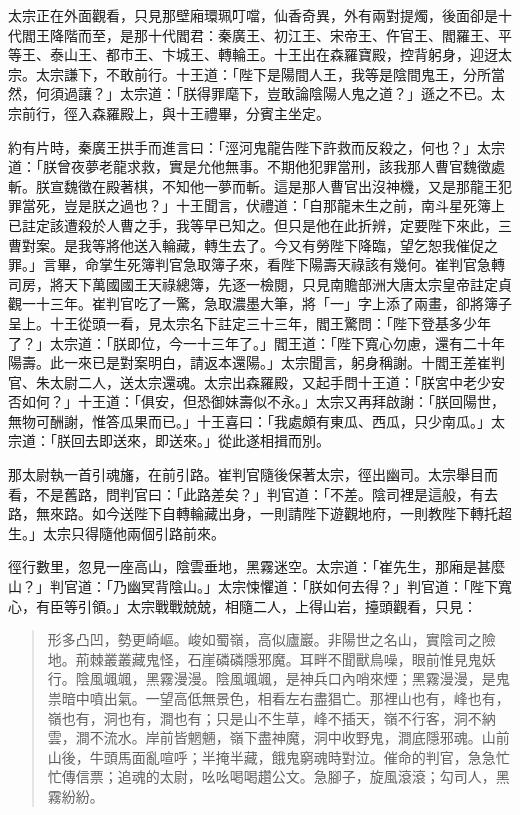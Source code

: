 太宗正在外面觀看，只見那壁廂環珮叮噹，仙香奇異，外有兩對提燭，後面卻是十代閻王降階而至，是那十代閻君：秦廣王、初江王、宋帝王、仵官王、閻羅王、平等王、泰山王、都市王、卞城王、轉輪王。十王出在森羅寶殿，控背躬身，迎迓太宗。太宗謙下，不敢前行。十王道：「陛下是陽間人王，我等是陰間鬼王，分所當然，何須過讓？」太宗道：「朕得罪麾下，豈敢論陰陽人鬼之道？」遜之不已。太宗前行，徑入森羅殿上，與十王禮畢，分賓主坐定。

約有片時，秦廣王拱手而進言曰：「涇河鬼龍告陛下許救而反殺之，何也？」太宗道：「朕曾夜夢老龍求救，實是允他無事。不期他犯罪當刑，該我那人曹官魏徵處斬。朕宣魏徵在殿著棋，不知他一夢而斬。這是那人曹官出沒神機，又是那龍王犯罪當死，豈是朕之過也？」十王聞言，伏禮道：「自那龍未生之前，南斗星死簿上已註定該遭殺於人曹之手，我等早已知之。但只是他在此折辨，定要陛下來此，三曹對案。是我等將他送入輪藏，轉生去了。今又有勞陛下降臨，望乞恕我催促之罪。」言畢，命掌生死簿判官急取簿子來，看陛下陽壽天祿該有幾何。崔判官急轉司房，將天下萬國國王天祿總簿，先逐一檢閱，只見南贍部洲大唐太宗皇帝註定貞觀一十三年。崔判官吃了一驚，急取濃墨大筆，將「一」字上添了兩畫，卻將簿子呈上。十王從頭一看，見太宗名下註定三十三年，閻王驚問：「陛下登基多少年了？」太宗道：「朕即位，今一十三年了。」閻王道：「陛下寬心勿慮，還有二十年陽壽。此一來已是對案明白，請返本還陽。」太宗聞言，躬身稱謝。十閻王差崔判官、朱太尉二人，送太宗還魂。太宗出森羅殿，又起手問十王道：「朕宮中老少安否如何？」十王道：「俱安，但恐御妹壽似不永。」太宗又再拜啟謝：「朕回陽世，無物可酬謝，惟答瓜果而已。」十王喜曰：「我處頗有東瓜、西瓜，只少南瓜。」太宗道：「朕回去即送來，即送來。」從此遂相揖而別。

那太尉執一首引魂旛，在前引路。崔判官隨後保著太宗，徑出幽司。太宗舉目而看，不是舊路，問判官曰：「此路差矣？」判官道：「不差。陰司裡是這般，有去路，無來路。如今送陛下自轉輪藏出身，一則請陛下遊觀地府，一則教陛下轉托超生。」太宗只得隨他兩個引路前來。

徑行數里，忽見一座高山，陰雲垂地，黑霧迷空。太宗道：「崔先生，那廂是甚麼山？」判官道：「乃幽冥背陰山。」太宗悚懼道：「朕如何去得？」判官道：「陛下寬心，有臣等引領。」太宗戰戰兢兢，相隨二人，上得山岩，擡頭觀看，只見：
\begin{quote}
形多凸凹，勢更崎嶇。峻如蜀嶺，高似廬巖。非陽世之名山，實陰司之險地。荊棘叢叢藏鬼怪，石崖磷磷隱邪魔。耳畔不聞獸鳥噪，眼前惟見鬼妖行。陰風颯颯，黑霧漫漫。陰風颯颯，是神兵口內哨來煙；黑霧漫漫，是鬼祟暗中噴出氣。一望高低無景色，相看左右盡猖亡。那裡山也有，峰也有，嶺也有，洞也有，澗也有；只是山不生草，峰不插天，嶺不行客，洞不納雲，澗不流水。岸前皆魍魎，嶺下盡神魔，洞中收野鬼，澗底隱邪魂。山前山後，牛頭馬面亂喧呼；半掩半藏，餓鬼窮魂時對泣。催命的判官，急急忙忙傳信票；追魂的太尉，吆吆喝喝趲公文。急腳子，旋風滾滾；勾司人，黑霧紛紛。
\end{quote}

